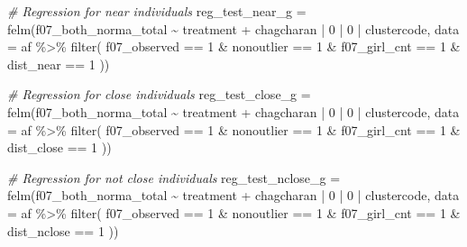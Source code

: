 \documentclass[
]{article}
\newenvironment{Shaded}{\begin{snugshade}}{\end{snugshade}}
\newcommand{\AttributeTok}[1]{\textcolor[rgb]{0.77,0.63,0.00}{#1}}
\newcommand{\CommentTok}[1]{\textcolor[rgb]{0.56,0.35,0.01}{\textit{#1}}}
\newcommand{\DecValTok}[1]{\textcolor[rgb]{0.00,0.00,0.81}{#1}}
\newcommand{\FunctionTok}[1]{\textcolor[rgb]{0.00,0.00,0.00}{#1}}
\newcommand{\NormalTok}[1]{#1}
\newcommand{\OtherTok}[1]{\textcolor[rgb]{0.56,0.35,0.01}{#1}}
\newcommand{\SpecialCharTok}[1]{\textcolor[rgb]{0.00,0.00,0.00}{#1}}
\begin{document}
\begin{Shaded}
\begin{Highlighting}[]
\CommentTok{\# Regression for near individuals}
\NormalTok{reg\_test\_near\_g }\OtherTok{=} \FunctionTok{felm}\NormalTok{(f07\_both\_norma\_total }\SpecialCharTok{\textasciitilde{}}\NormalTok{ treatment }\SpecialCharTok{+} 
\NormalTok{                   chagcharan }\SpecialCharTok{|} \DecValTok{0} \SpecialCharTok{|} \DecValTok{0} \SpecialCharTok{|}\NormalTok{ clustercode,}
         \AttributeTok{data =}\NormalTok{ af }\SpecialCharTok{\%\textgreater{}\%} \FunctionTok{filter}\NormalTok{( }
\NormalTok{                              f07\_observed }\SpecialCharTok{==} \DecValTok{1} \SpecialCharTok{\&}
\NormalTok{                              nonoutlier }\SpecialCharTok{==} \DecValTok{1} \SpecialCharTok{\&}
\NormalTok{                              f07\_girl\_cnt }\SpecialCharTok{==} \DecValTok{1} \SpecialCharTok{\&}
\NormalTok{                              dist\_near }\SpecialCharTok{==} \DecValTok{1}
\NormalTok{                              ))}

\CommentTok{\# Regression for close individuals}
\NormalTok{reg\_test\_close\_g }\OtherTok{=} \FunctionTok{felm}\NormalTok{(f07\_both\_norma\_total }\SpecialCharTok{\textasciitilde{}}\NormalTok{ treatment }\SpecialCharTok{+} 
\NormalTok{                   chagcharan }\SpecialCharTok{|} \DecValTok{0} \SpecialCharTok{|} \DecValTok{0} \SpecialCharTok{|}\NormalTok{ clustercode,}
         \AttributeTok{data =}\NormalTok{ af }\SpecialCharTok{\%\textgreater{}\%} \FunctionTok{filter}\NormalTok{( }
\NormalTok{                              f07\_observed }\SpecialCharTok{==} \DecValTok{1} \SpecialCharTok{\&}
\NormalTok{                              nonoutlier }\SpecialCharTok{==} \DecValTok{1} \SpecialCharTok{\&}
\NormalTok{                              f07\_girl\_cnt }\SpecialCharTok{==} \DecValTok{1} \SpecialCharTok{\&}
\NormalTok{                              dist\_close }\SpecialCharTok{==} \DecValTok{1}
\NormalTok{                              ))}

\CommentTok{\# Regression for not close individuals}
\NormalTok{reg\_test\_nclose\_g }\OtherTok{=} \FunctionTok{felm}\NormalTok{(f07\_both\_norma\_total }\SpecialCharTok{\textasciitilde{}}\NormalTok{ treatment }\SpecialCharTok{+} 
\NormalTok{                   chagcharan }\SpecialCharTok{|} \DecValTok{0} \SpecialCharTok{|} \DecValTok{0} \SpecialCharTok{|}\NormalTok{ clustercode,}
         \AttributeTok{data =}\NormalTok{ af }\SpecialCharTok{\%\textgreater{}\%} \FunctionTok{filter}\NormalTok{( }
\NormalTok{                              f07\_observed }\SpecialCharTok{==} \DecValTok{1} \SpecialCharTok{\&}
\NormalTok{                              nonoutlier }\SpecialCharTok{==} \DecValTok{1} \SpecialCharTok{\&}
\NormalTok{                              f07\_girl\_cnt }\SpecialCharTok{==} \DecValTok{1} \SpecialCharTok{\&}
\NormalTok{                              dist\_nclose }\SpecialCharTok{==} \DecValTok{1}
\NormalTok{                              ))}


\end{Highlighting}
\end{Shaded}
\end{document}
